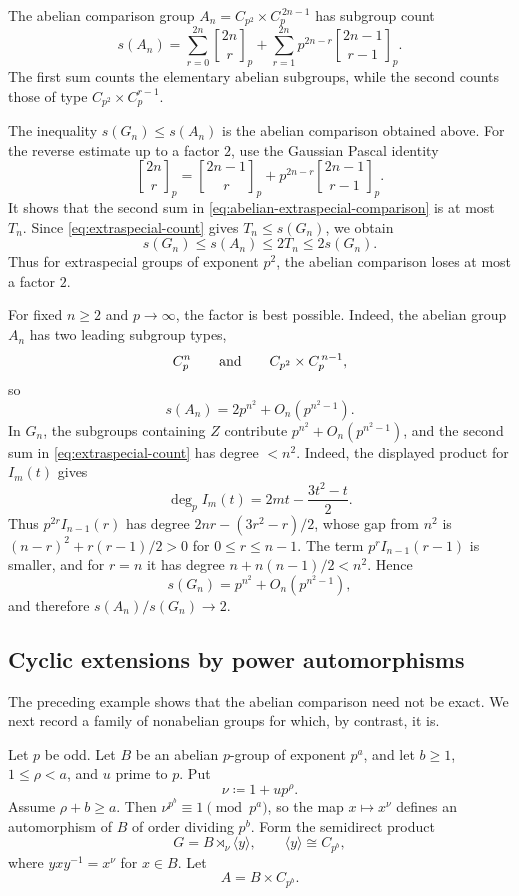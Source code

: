 \documentclass[a4paper,11pt,reqno]{amsart}
\theoremstyle{plain}
\theoremstyle{remark}
\numberwithin{equation}{section}
\newcommand{\gauss}[2]{\genfrac{[}{]}{0pt}{}{#1}{#2}_p}
\renewcommand{\leq}{\leqslant}
\renewcommand{\geq}{\geqslant}
\begin{document}
The abelian comparison group $A_n=C_{p^2}\times C_p^{\,2n-1}$ has subgroup
count
\begin{equation}\label{eq:abelian-extraspecial-comparison}
        s(A_n)
        =
        \sum_{r=0}^{2n}\gauss{2n}{r}
        +
        \sum_{r=1}^{2n}p^{2n-r}\gauss{2n-1}{r-1}.
\end{equation}
The first sum counts the elementary abelian subgroups, while the second counts
those of type $C_{p^2}\times C_p^{r-1}$.

The inequality $s(G_n)\leq s(A_n)$ is the abelian comparison obtained above.
For the reverse estimate up to a factor $2$, use the Gaussian Pascal identity
\[
        \gauss{2n}{r}
        =
        \gauss{2n-1}{r}
        +
        p^{2n-r}\gauss{2n-1}{r-1}.
\]
It shows that the second sum in \eqref{eq:abelian-extraspecial-comparison} is
at most $T_n$. Since \eqref{eq:extraspecial-count} gives $T_n\leq s(G_n)$,
we obtain
\[
        s(G_n)\leq s(A_n)\leq 2T_n\leq 2s(G_n).
\]
Thus for extraspecial groups of exponent $p^2$, the abelian comparison loses
at most a factor $2$.

For fixed $n\geq 2$ and $p\to\infty$, the factor is best possible. Indeed, the
abelian group $A_n$ has two leading subgroup types,
\[
        C_p^n
        \qquad\textnormal{and}\qquad
        C_{p^2}\times C_p^{\,n-1},
\]
so
\[
        s(A_n)=2p^{n^2}+O_n(p^{n^2-1}).
\]
In $G_n$, the subgroups containing $Z$ contribute
$p^{n^2}+O_n(p^{n^2-1})$, and the second sum in
\eqref{eq:extraspecial-count} has degree $<n^2$. Indeed, the displayed product
for $I_m(t)$ gives
\[
        \deg_p I_m(t)=2mt-\frac{3t^2-t}{2}.
\]
Thus $p^{2r}I_{n-1}(r)$ has degree
$2nr-(3r^2-r)/2$, whose gap from $n^2$ is
$(n-r)^2+r(r-1)/2>0$ for $0\leq r\leq n-1$. The term
$p^rI_{n-1}(r-1)$ is smaller, and for $r=n$ it has degree
$n+n(n-1)/2<n^2$. Hence
\[
        s(G_n)=p^{n^2}+O_n(p^{n^2-1}),
\]
and therefore $s(A_n)/s(G_n)\to 2$.

\subsection{Cyclic extensions by power automorphisms}

The preceding example shows that the abelian comparison need not be exact. We
next record a family of nonabelian groups for which, by contrast, it is.

Let $p$ be odd. Let $B$ be an abelian $p$-group of exponent $p^a$, and
let $b\geq 1$, $1\leq \rho<a$, and $u$ prime to $p$. Put
\[
        \nu\coloneqq 1+up^\rho.
\]
Assume $\rho+b\geq a$. Then $\nu^{p^b}\equiv 1\pmod{p^a}$, so the map
$x\mapsto x^\nu$ defines an automorphism of $B$ of order dividing
$p^b$. Form the semidirect product
\[
        G=B\rtimes_\nu \langle y\rangle,
        \qquad
        \langle y\rangle\cong C_{p^b},
\]
where $yxy^{-1}=x^\nu$ for $x\in B$. Let
\[
        A=B\times C_{p^b}.
\]
\end{document}
